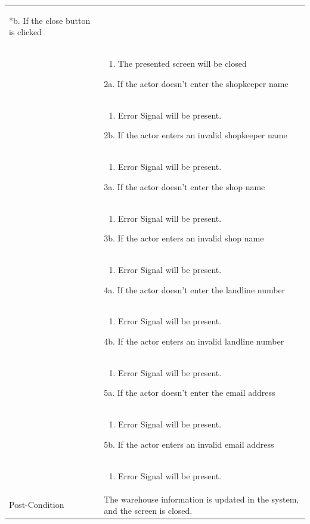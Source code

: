 \documentclass[12pt,a4paper]{article}
\begin{document}
\begin{longtable}{| p{3cm}|p{12cm}|}
\begin{enumerate}
	\end{enumerate}
*b. If the close button is clicked\\
&	\begin{enumerate}
		\item The presented screen will be closed
	\end{enumerate}
2a. If the actor doesn't enter the shopkeeper name \\ 	
&	\begin{enumerate}
		\item Error Signal will be present.
	\end{enumerate}
2b. If the actor enters an invalid shopkeeper name \\ 	
&	\begin{enumerate}
		\item Error Signal will be present.
	\end{enumerate}
3a. If the actor doesn't enter the shop name \\ 	
&	\begin{enumerate}
		\item Error Signal will be present.
	\end{enumerate}
3b. If the actor enters an invalid shop name \\ 	
&	\begin{enumerate}
		\item Error Signal will be present.
	\end{enumerate}
4a. If the actor doesn't enter the landline number \\ 	
&	\begin{enumerate}
		\item Error Signal will be present.
	\end{enumerate}
4b. If the actor enters an invalid landline number\\ 	
&	\begin{enumerate}
		\item Error Signal will be present.
	\end{enumerate}
5a. If the actor doesn't enter the email address \\ 	
&	\begin{enumerate}
		\item Error Signal will be present.
	\end{enumerate}
5b. If the actor enters an invalid email address\\ 	
&	\begin{enumerate}
		\item Error Signal will be present.
	\end{enumerate}
\\ \hline
Post-Condition & The warehouse information is updated in the system, and the screen is closed.  \\\hline
\end{longtable}
\end{document}
